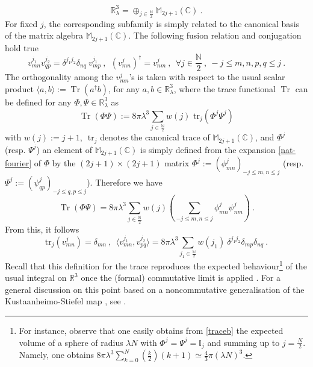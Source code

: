 \documentclass[a4paper,11pt,twoside]{article}
\numberwithin{equation}{section}
\newcommand\bbone{{ \mathbb{I}}}
\DeclareMathOperator{\tr}{Tr}
\theoremstyle{nonumberplain}
\newcounter{and}
\begin{document}
%
\begin{equation*}
\mathbb{R}^3_\lambda = \oplus_{j\in\frac{\mathbb{N}}{2}}\mathbb{M}_{2j+1}(\mathbb{C}) \ . 
\end{equation*}
%
For fixed $j$, the corresponding subfamily is simply related to the canonical basis of the matrix algebra $\mathbb{M}_{2j+1}(\mathbb{C})$. The following fusion relation and conjugation hold true%
%
\begin{equation}
v^{j_1}_{mn} v^{j_2}_{qp} = \delta^{j_1j_2} \delta_{nq} \ v^{j_1}_{mp} \ , \ \ (v^j_{mn})^\dag=v^j_{nm} \ , \ \ 
\forall j\in\frac{\mathbb{N}}{2} \ , \ -j\le m,n,p,q\le j \ . \label{fusion}
\end{equation}
%
The orthogonality among the $v^j_{mn}$'s is taken with respect to the usual scalar product $\langle a,b\rangle:=\tr(a^\dag b)$, for any $a,b\in\mathbb{R}^3_\lambda$, where the trace functional $\tr$ can be defined \cite{gervitwal-13} for any $\Phi,\Psi\in\mathbb{R}^3_\lambda$ as%
%
\begin{equation*}
\tr(\Phi\Psi) := 8 \pi \lambda^3 \sum_{j\in\frac{\mathbb{N}}{2}} w(j) \mbox{ tr}_j(\Phi^j\Psi^j)
\end{equation*}
%
with $w(j) := j+1$, $\mbox{ tr}_j$ denotes the canonical trace of $\mathbb{M}_{2j+1}(\mathbb{C})$, and $\Phi^j$ (resp. $\Psi^j$) an element of $\mathbb{M}_{2j+1}(\mathbb{C})$ is simply defined from the expansion \eqref{nat-fourier} of $\Phi$ by the $(2j+1)\times(2j+1)$ matrix $\Phi^j:=(\phi^j_{mn})_{-j\le m,n\le j}$ (resp. $\Psi^j:= (\psi^j_{qp})_{-j\le q,p\le j}$). Therefore we have%
%
\begin{equation}
\tr(\Phi\Psi)  = 8 \pi \lambda^3 \sum_{j\in\frac{\mathbb{N}}{2}} w(j) \left( \sum_{-j\le m,n\le j}\phi^j_{mn}\psi^j_{nm}\right) \ . \label{traceb} 
\end{equation}
%
From this, it follows%
%
\begin{equation}
\mbox{tr}_j(v^j_{mn}) = \delta_{mn} \ , \ \
\langle v^{j_1}_{mn} , v^{j_2}_{pq} \rangle = 8 \pi \lambda^3 \sum_{j_1\in\frac{\mathbb{N}}{2}} w(j_1) \ \delta^{j_1j_2} \delta_{mp} \delta_{nq} \ . \label{ortho-normaliz}
\end{equation}
%
Recall that this definition for the trace reproduces the expected behaviour{\footnote{For instance, observe that one easily obtains from \eqref{traceb} the expected volume of a sphere of radius $\lambda N$ with $\Phi^j=\Psi^j=\bbone_j$ and summing up to $j=\frac{N}{2}$. Namely, one obtains $8\pi\lambda^3\sum_{k=0}^{N}(\frac{k}{2})(k+1)\simeq\frac{4}{3}\pi(\lambda N)^3$.}} of the usual integral on $\mathbb{R}^3$ once the (formal) commutative limit is applied \cite{gervitwal-13}. For a general discussion on this point based on a noncommutative generalisation of the Kustaanheimo-Stiefel map \cite{ksmap}, see \cite{pv-ksmap}. \par%
\end{document}
